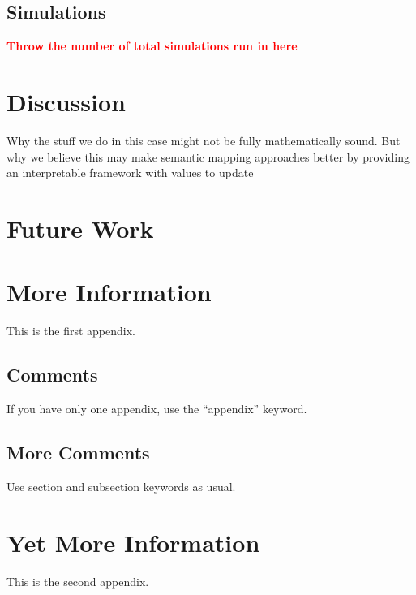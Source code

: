 \documentclass[twocolumn,letterpaper]{IEEEAerospaceCLS}  %
\newcommand\todo[1]{\textbf{\textcolor{red}{#1}}}
\begin{document}
\subsection{Simulations} \label{ssec:ResSim}
\todo{Throw the number of total simulations run in here}

\section{Discussion} \label{sec:Disc}
Why the stuff we do in this case might not be fully mathematically sound. But why we believe this may make semantic mapping approaches better by providing an interpretable framework with values to update
\section{Future Work} \label{sec:Fut}
\appendices{}              %

\section{More Information}        %
This is the first appendix.

\subsection{Comments}
If you have only one appendix, use the ``appendix'' keyword.

\subsection{More Comments}
Use section and subsection keywords as usual.

\section{Yet More Information}    %
This is the second appendix.
\end{document}
